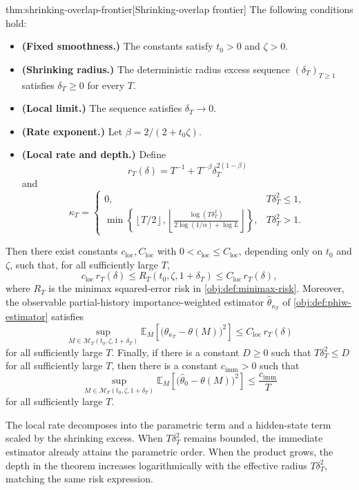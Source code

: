 \documentclass[11pt]{article}
\begin{document}
\begin{theoremv}{thm:shrinking-overlap-frontier}[Shrinking-overlap frontier]
The following conditions hold:
\begin{itemize}
\item \textbf{(Fixed smoothness.)} The constants satisfy \(t_0>0\) and \(\zeta>0\).
\item \textbf{(Shrinking radius.)} The deterministic radius excess sequence \((\delta_T)_{T\ge1}\) satisfies \(\delta_T\ge0\) for every \(T\).
\item \textbf{(Local limit.)} The sequence satisfies \(\delta_T\to0\).
\item \textbf{(Rate exponent.)} Let \(\beta=2/(2+t_0\zeta)\).
\item \textbf{(Local rate and depth.)} Define
\[
r_T(\delta)
=
T^{-1}+T^{-\beta}\delta_T^{2(1-\beta)}
\]
and
\[
\kappa_T
=
\begin{cases}
0, & T\delta_T^2\le 1,\\[3pt]
\displaystyle
\min\left\{\left\lfloor T/2\right\rfloor,
\left\lfloor
\frac{\log(T\delta_T^2)}
{2\log(1/\alpha)+\log L}
\right\rfloor\right\}, & T\delta_T^2>1.
\end{cases}
\]
\end{itemize}
Then there exist constants \(c_{\mathrm{loc}},C_{\mathrm{loc}}\) with
\(0<c_{\mathrm{loc}}\le C_{\mathrm{loc}}\), depending only on \(t_0\) and
\(\zeta\), such that, for all sufficiently large \(T\),
\[
c_{\mathrm{loc}}\,r_T(\delta)
\le
R_T(t_0,\zeta,1+\delta_T)
\le
C_{\mathrm{loc}}\,r_T(\delta),
\]
where \(R_T\) is the minimax squared-error risk in
\cref{obj:def:minimax-risk}.  Moreover, the observable partial-history
importance-weighted estimator \(\widehat\theta_{\kappa_T}\) of
\cref{obj:def:phiw-estimator} satisfies
\[
\sup_{M\in\mathcal M_T(t_0,\zeta,1+\delta_T)}
\mathbb E_M\!\left[
\bigl(\widehat\theta_{\kappa_T}-\theta(M)\bigr)^2
\right]
\le
C_{\mathrm{loc}}\,r_T(\delta)
\]
for all sufficiently large \(T\).  Finally, if there is a constant \(D\ge0\)
such that \(T\delta_T^2\le D\) for all sufficiently large \(T\), then there is
a constant \(c_{\mathrm{imm}}>0\) such that
\[
\sup_{M\in\mathcal M_T(t_0,\zeta,1+\delta_T)}
\mathbb E_M\!\left[
\bigl(\widehat\theta_{0}-\theta(M)\bigr)^2
\right]
\le
\frac{c_{\mathrm{imm}}}{T}
\]
for all sufficiently large \(T\).
\end{theoremv}

The local rate decomposes into the parametric term and a hidden-state term scaled by the shrinking excess. When \(T\delta_T^2\) remains bounded, the immediate estimator already attains the parametric order. When the product grows, the depth in the theorem increases logarithmically with the effective radius \(T\delta_T^2\), matching the same risk expression.
\end{document}
